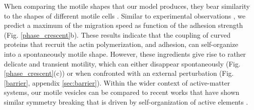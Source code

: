 \documentclass[pre,amsmath]{revtex4}
\begin{document}
When comparing the motile shapes that our model produces, they bear similarity to the shapes of different motile cells \cite{mogilner2009shape}. Similar to experimental observations \cite{dimilla1991mathematical,klank2017biphasic,liu2020cell}, we predict a maximum of the migration speed as function of the adhesion strength (Fig. \ref{phase_crescent}b). These results indicate that the coupling of curved proteins that recruit the actin polymerization, and adhesion, can self-organize into a spontaneously motile shape. However, these ingredients give rise to rather delicate and transient motility, which can either disappear spontaneously (Fig. \ref{phase_crescent}(c)) or when confronted with an external perturbation (Fig. \ref{barrier}, appendix \ref{sec:barrier}). Within the wider context of active-matter systems, our motile vesicles can be compared to recent works that have shown similar symmetry breaking that is driven by self-organization of active elements \cite{abaurrea2019vesicles}.
\end{document}
